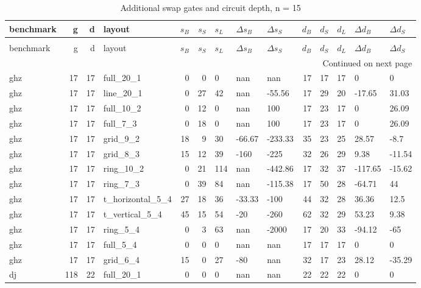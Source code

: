 \begin{longtable}{lrrlrrlllrrlll}
\caption{Additional swap gates and circuit depth, n = 15} \label{benchmark-table-15} \\
\toprule
benchmark & g & d & layout & $s_B$ & $s_S$ & $s_L$ & $\Delta s_B$ & $\Delta s_S$ & $d_B$ & $d_S$ & $d_L$ & $\Delta d_B$ & $\Delta d_S$ \\
\midrule
\endfirsthead
\caption[]{Additional swap gates and circuit depth, n = 15} \\
\toprule
benchmark & g & d & layout & $s_B$ & $s_S$ & $s_L$ & $\Delta s_B$ & $\Delta s_S$ & $d_B$ & $d_S$ & $d_L$ & $\Delta d_B$ & $\Delta d_S$ \\
\midrule
\endhead
\midrule
\multicolumn{14}{r}{Continued on next page} \\
\midrule
\endfoot
\bottomrule
\endlastfoot
ghz & 17 & 17 & full\_20\_1 & 0 & 0 & 0 & nan & nan & 17 & 17 & 17 & 0 & 0 \\
ghz & 17 & 17 & line\_20\_1 & 0 & 27 & 42 & nan & -55.56 & 17 & 29 & 20 & -17.65 & 31.03 \\
ghz & 17 & 17 & full\_10\_2 & 0 & 12 & 0 & nan & 100 & 17 & 23 & 17 & 0 & 26.09 \\
ghz & 17 & 17 & full\_7\_3 & 0 & 18 & 0 & nan & 100 & 17 & 23 & 17 & 0 & 26.09 \\
ghz & 17 & 17 & grid\_9\_2 & 18 & 9 & 30 & -66.67 & -233.33 & 35 & 23 & 25 & 28.57 & -8.7 \\
ghz & 17 & 17 & grid\_8\_3 & 15 & 12 & 39 & -160 & -225 & 32 & 26 & 29 & 9.38 & -11.54 \\
ghz & 17 & 17 & ring\_10\_2 & 0 & 21 & 114 & nan & -442.86 & 17 & 32 & 37 & -117.65 & -15.62 \\
ghz & 17 & 17 & ring\_7\_3 & 0 & 39 & 84 & nan & -115.38 & 17 & 50 & 28 & -64.71 & 44 \\
ghz & 17 & 17 & t\_horizontal\_5\_4 & 27 & 18 & 36 & -33.33 & -100 & 44 & 32 & 28 & 36.36 & 12.5 \\
ghz & 17 & 17 & t\_vertical\_5\_4 & 45 & 15 & 54 & -20 & -260 & 62 & 32 & 29 & 53.23 & 9.38 \\
ghz & 17 & 17 & ring\_5\_4 & 0 & 3 & 63 & nan & -2000 & 17 & 20 & 33 & -94.12 & -65 \\
ghz & 17 & 17 & full\_5\_4 & 0 & 0 & 0 & nan & nan & 17 & 17 & 17 & 0 & 0 \\
ghz & 17 & 17 & grid\_6\_4 & 15 & 0 & 27 & -80 & nan & 32 & 17 & 23 & 28.12 & -35.29 \\
dj & 118 & 22 & full\_20\_1 & 0 & 0 & 0 & nan & nan & 22 & 22 & 22 & 0 & 0 \\

\end{longtable}
